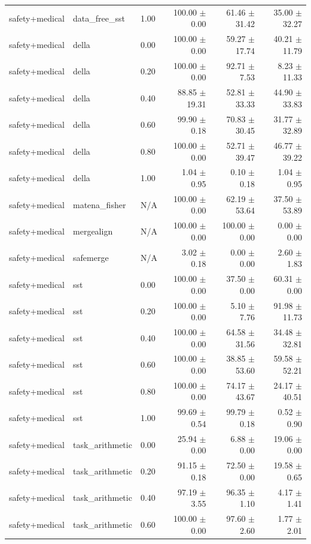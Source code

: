\documentclass{article}
\begin{document}
\begin{table}[H]
{\begin{tabular}{lllrrr}
safety+medical & data\_free\_sst & 1.00 & 100.00 $\pm$ 0.00 & 61.46 $\pm$ 31.42 & 35.00 $\pm$ 32.27 \\
safety+medical & della & 0.00 & 100.00 $\pm$ 0.00 & 59.27 $\pm$ 17.74 & 40.21 $\pm$ 11.79 \\
safety+medical & della & 0.20 & 100.00 $\pm$ 0.00 & 92.71 $\pm$ 7.53 & 8.23 $\pm$ 11.33 \\
safety+medical & della & 0.40 & 88.85 $\pm$ 19.31 & 52.81 $\pm$ 33.33 & 44.90 $\pm$ 33.83 \\
safety+medical & della & 0.60 & 99.90 $\pm$ 0.18 & 70.83 $\pm$ 30.45 & 31.77 $\pm$ 32.89 \\
safety+medical & della & 0.80 & 100.00 $\pm$ 0.00 & 52.71 $\pm$ 39.47 & 46.77 $\pm$ 39.22 \\
safety+medical & della & 1.00 & 1.04 $\pm$ 0.95 & 0.10 $\pm$ 0.18 & 1.04 $\pm$ 0.95 \\
safety+medical & matena\_fisher & N/A & 100.00 $\pm$ 0.00 & 62.19 $\pm$ 53.64 & 37.50 $\pm$ 53.89 \\
safety+medical & mergealign & N/A & 100.00 $\pm$ 0.00 & 100.00 $\pm$ 0.00 & 0.00 $\pm$ 0.00 \\
safety+medical & safemerge & N/A & 3.02 $\pm$ 0.18 & 0.00 $\pm$ 0.00 & 2.60 $\pm$ 1.83 \\
safety+medical & sst & 0.00 & 100.00 $\pm$ 0.00 & 37.50 $\pm$ 0.00 & 60.31 $\pm$ 0.00 \\
safety+medical & sst & 0.20 & 100.00 $\pm$ 0.00 & 5.10 $\pm$ 7.76 & 91.98 $\pm$ 11.73 \\
safety+medical & sst & 0.40 & 100.00 $\pm$ 0.00 & 64.58 $\pm$ 31.56 & 34.48 $\pm$ 32.81 \\
safety+medical & sst & 0.60 & 100.00 $\pm$ 0.00 & 38.85 $\pm$ 53.60 & 59.58 $\pm$ 52.21 \\
safety+medical & sst & 0.80 & 100.00 $\pm$ 0.00 & 74.17 $\pm$ 43.67 & 24.17 $\pm$ 40.51 \\
safety+medical & sst & 1.00 & 99.69 $\pm$ 0.54 & 99.79 $\pm$ 0.18 & 0.52 $\pm$ 0.90 \\
safety+medical & task\_arithmetic & 0.00 & 25.94 $\pm$ 0.00 & 6.88 $\pm$ 0.00 & 19.06 $\pm$ 0.00 \\
safety+medical & task\_arithmetic & 0.20 & 91.15 $\pm$ 0.18 & 72.50 $\pm$ 0.00 & 19.58 $\pm$ 0.65 \\
safety+medical & task\_arithmetic & 0.40 & 97.19 $\pm$ 3.55 & 96.35 $\pm$ 1.10 & 4.17 $\pm$ 1.41 \\
safety+medical & task\_arithmetic & 0.60 & 100.00 $\pm$ 0.00 & 97.60 $\pm$ 2.60 & 1.77 $\pm$ 2.01 \\

\end{tabular}}
\end{table}
\end{document}
